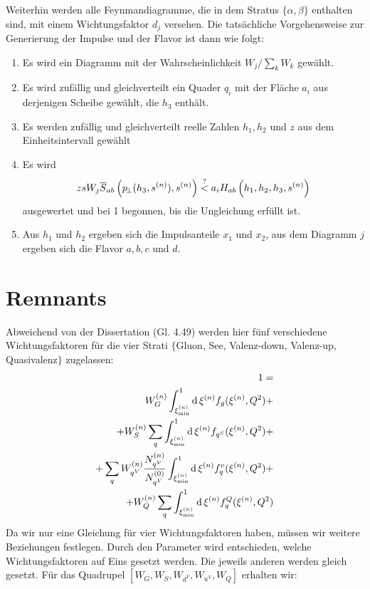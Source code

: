 Weiterhin werden alle Feynmandiagramme, die in dem Stratus $\{\alpha,\beta\}$ enthalten sind, mit einem Wicht\-ungs\-faktor $d_j$ versehen. Die tatsächliche Vorgehensweise zur Generierung der Impulse und der Flavor ist dann wie folgt:

\begin{enumerate}
  \item Es wird ein Diagramm mit der Wahrscheinlichkeit $W_j/\sum_k W_k$ gewählt.
  \item Es wird zufällig und gleichverteilt ein Quader $q_i$ mit der Fläche $a_i$ aus derjenigen Scheibe gewählt, die $h_3$ enthält.
  \item Es werden zufällig und gleichverteilt reelle Zahlen $h_1,h_2$ und $z$ aus dem Einheitsintervall gewählt
  \item Es wird 
    \begin{equation}\label{eq:all:importance}
      zsW_j\overline{S}_{ab}\left(p_{\!\perp}(h_3,s^{(n)}),s^{(n)}\right)\overset{?}{<}a_iH_{ab}\left(h_1,h_2,h_3,s^{(n)}\right)
    \end{equation}
    ausgewertet und bei 1 begonnen, bis die Ungleichung erfüllt ist.
  \item
    Aus $h_1$ und $h_2$ ergeben sich die Impulsanteile $x_1$ und $x_2$, aus dem Diagramm $j$ ergeben sich die Flavor $a,b,c$ und $d$.
\end{enumerate}
\section{Remnants}
Abweichend von der Dissertation (Gl. 4.49) werden hier fünf verschiedene Wichtungsfaktoren für die vier Strati $\{$Gluon, See, Valenz-down, Valenz-up, Quasivalenz$\}$ zugelassen:
\begin{equation}
  \begin{split}
    1=\\
    W_G^{(n)}\int_{\xi_{\min}^{(n)}}^{1}\operatorname{d} \xi^{(n)}f_g(\xi^{(n)},Q^2)+\\
    +W_S^{(n)}\sum_q\int_{\xi_{\min}^{(n)}}^{1}\operatorname{d} \xi^{(n)}f_{q^{S}}(\xi^{(n)},Q^2)+\\
    +\sum_qW_{q^V}^{(n)}\frac{N_{q^V}^{(n)}}{N_{q^V}^{(0)}}\int_{\xi_{\min}^{(n)}}^{1}\operatorname{d} \xi^{(n)}f_q^v(\xi^{(n)},Q^2)+\\
    +W_Q^{(n)}\sum_q\int_{\xi_{\min}^{(n)}}^{1}\operatorname{d} \xi^{(n)}f_q^Q(\xi^{(n)},Q^2)\label{eq:all:rem:sumrule}
  \end{split}
\end{equation}
Da wir nur eine Gleichung für vier Wichtungsfaktoren haben, müssen wir weitere Beziehungen festlegen. Durch den Parameter  wird entschieden, welche Wichtungsfaktoren auf Eins gesetzt werden. Die jeweils anderen werden gleich gesetzt. Für das Quadrupel $[W_G,W_S,W_{d^V},W_{u^V},W_Q]$ erhalten wir:

